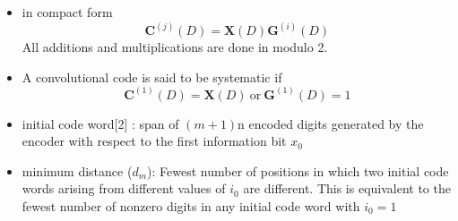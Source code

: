 \documentclass[fontsize=12pt]{article}
\begin{document}
\begin{enumerate}
\begin{itemize}
\item in compact form 
\begin{equation}
\mathbf{C}^{(j)}(D)=\mathbf{X}(D)\mathbf{\mathbf{G}}^{(i)}(D)
\end{equation}
All additions and multiplications are done in modulo 2.

\item A convolutional code is said to be systematic if  
\begin{equation}
\mathbf{C}^{(1)}(D)=\mathbf{X}(D)~\text{or} ~\mathbf{\mathbf{G}}^{(1)}(D)=1
\end{equation}

\item initial code word[2] : span of $(m+1)$n encoded digits generated by  the encoder with respect to the first information bit $x_0$

\item minimum distance ($d_m$): Fewest number of positions in which two initial code words arising from different values of $i_0$ are different. This is equivalent to the fewest number of nonzero digits in any initial code word with $i_0 = 1$ 
\end{itemize}

\end{enumerate}
\end{document}
